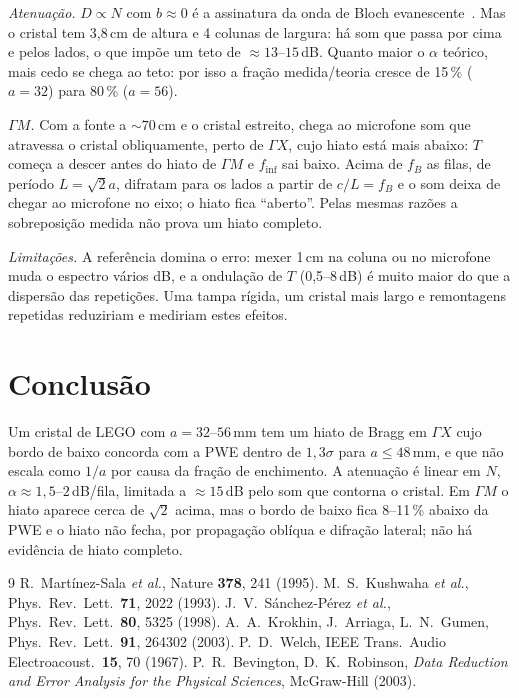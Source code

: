 \documentclass[10pt,twocolumn,a4paper]{article}
\newcommand{\GX}{\Gamma X}
\newcommand{\GM}{\Gamma M}
\newcommand{\finf}{f_\text{inf}}
\begin{document}
\emph{Atenuação.} $D\propto N$ com $b\approx0$ é a assinatura da onda de Bloch evanescente~\cite{sanchez1998}. Mas o
cristal tem 3,8\,cm de altura e 4 colunas de largura: há som que passa por cima e pelos lados, o
que impõe um teto de ${\approx}13$--$15$\,dB. Quanto maior o $\alpha$ teórico, mais cedo se chega ao
teto: por isso a fração medida/teoria cresce de 15\,\% ($a=32$) para 80\,\% ($a=56$).

\emph{$\GM$.} Com a fonte a ${\sim}70$\,cm e o cristal estreito, chega ao microfone som que atravessa o
cristal obliquamente, perto de $\GX$, cujo hiato está mais abaixo: $T$ começa a descer antes do
hiato de $\GM$ e $\finf$ sai baixo. Acima de $f_B$ as filas, de período $L=\sqrt2a$, difratam para
os lados a partir de $c/L=f_B$ e o som deixa de chegar ao microfone no eixo; o hiato fica ``aberto''.
Pelas mesmas razões a sobreposição medida não prova um hiato completo.

\emph{Limitações.} A referência domina o erro: mexer 1\,cm na coluna ou no microfone muda o espectro
vários dB, e a ondulação de $T$ (0,5--8\,dB) é muito maior do que a dispersão das repetições. Uma tampa
rígida, um cristal mais largo e remontagens repetidas reduziriam e mediriam estes efeitos.

\section{Conclusão}
Um cristal de LEGO com $a=32$--$56$\,mm tem um hiato de Bragg em $\GX$ cujo bordo de baixo concorda
com a PWE dentro de $1{,}3\sigma$ para $a\le48$\,mm, e que não escala como $1/a$ por causa da fração
de enchimento. A atenuação é linear em $N$, $\alpha\approx1{,}5$--$2$\,dB/fila, limitada a
${\approx}15$\,dB pelo som que contorna o cristal. Em $\GM$ o hiato aparece cerca de $\sqrt2$ acima,
mas o bordo de baixo fica 8--11\,\% abaixo da PWE e o hiato não fecha, por propagação oblíqua e
difração lateral; não há evidência de hiato completo.

\begingroup
\scriptsize
\begin{thebibliography}{9}\setlength{\itemsep}{0pt}\setlength{\parsep}{0pt}
 R.~Martínez-Sala \emph{et al.}, Nature \textbf{378}, 241 (1995).
 M.~S.~Kushwaha \emph{et al.}, Phys.\ Rev.\ Lett.\ \textbf{71}, 2022 (1993).
 J.~V.~Sánchez-Pérez \emph{et al.}, Phys.\ Rev.\ Lett.\ \textbf{80}, 5325 (1998).
 A.~A.~Krokhin, J.~Arriaga, L.~N.~Gumen, Phys.\ Rev.\ Lett.\ \textbf{91}, 264302 (2003).
 P.~D.~Welch, IEEE Trans.\ Audio Electroacoust.\ \textbf{15}, 70 (1967).
 P.~R.~Bevington, D.~K.~Robinson, \emph{Data Reduction and Error Analysis for the
  Physical Sciences}, McGraw-Hill (2003).
\end{thebibliography}
\endgroup
\end{document}
